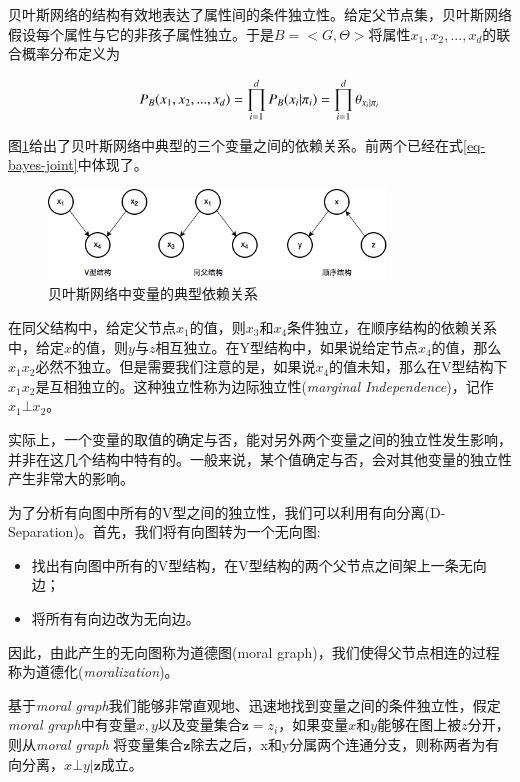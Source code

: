 贝叶斯网络的结构有效地表达了属性间的条件独立性。给定父节点集，贝叶斯网络假设每个属性与它的非孩子属性独立。于是$B = <G,\Theta>$将属性$x_1,x_2,...,x_d$的联合概率分布定义为

\begin{equation}
P_B(x_1,x_2,...,x_d) = \prod_{i=1}^{d} P_B(x_i | \pi_i) = \prod_{i=1}^{d}\theta_{x_i|\pi_i}\\
\label{eq-bayes-joint}
\end{equation}

图\ref{fig-bayes-dependence}给出了贝叶斯网络中典型的三个变量之间的依赖关系。前两个已经在式\ref{eq-bayes-joint}中体现了。




\begin{figure}[ht]
    \centering
    \includegraphics[scale=1, width=0.8\textwidth]{figure/BNrelation.png}
    \caption{贝叶斯网络中变量的典型依赖关系}
    \label{fig-bayes-dependence}
\end{figure}


在同父结构中，给定父节点$x_1$的值，则$x_3$和$x_4$条件独立，在顺序结构的依赖关系中，给定$x$的值，则$y$与$z$相互独立。在Y型结构中，如果说给定节点$x_4$的值，那么$x_1$$x_2$必然不独立。但是需要我们注意的是，如果说$x_4$的值未知，那么在V型结构下$x_1$$x_2$是互相独立的。这种独立性称为边际独立性(\textit{marginal Independence})，记作$x_1 \bot x_2$。

实际上，一个变量的取值的确定与否，能对另外两个变量之间的独立性发生影响，并非在这几个结构中特有的。一般来说，某个值确定与否，会对其他变量的独立性产生非常大的影响。

为了分析有向图中所有的V型之间的独立性，我们可以利用有向分离(D-Separation)。首先，我们将有向图转为一个无向图:

\begin{itemize}
	\item 找出有向图中所有的V型结构，在V型结构的两个父节点之间架上一条无向边；
	\item 将所有有向边改为无向边。
\end{itemize}

因此，由此产生的无向图称为道德图(moral graph)，我们使得父节点相连的过程称为道德化(\textit{moralization})。

基于\textit{moral graph}我们能够非常直观地、迅速地找到变量之间的条件独立性，假定\textit{moral graph}中有变量$x, y$以及变量集合$\bm{z} = {z_i}$，如果变量$x$和$y$能够在图上被$z$分开，则从\textit{moral graph} 将变量集合$\bm{z}$除去之后，x和y分属两个连通分支，则称两者为有向分离，$x \bot y | \bm{z}$成立。



